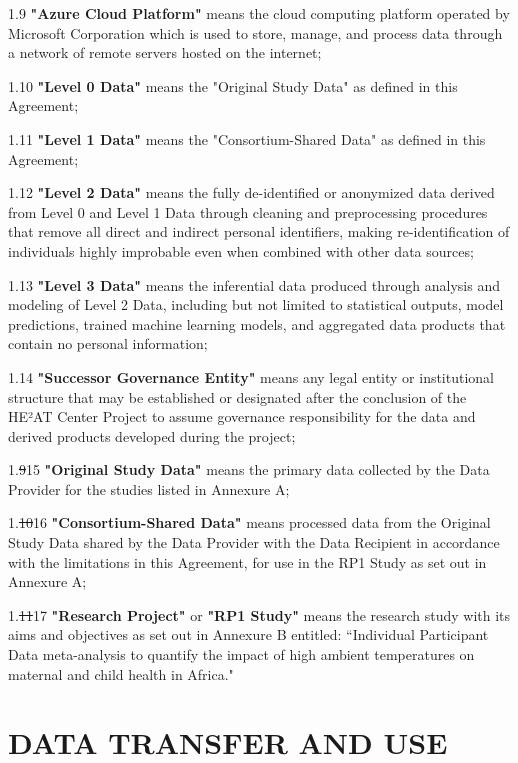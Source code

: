 \documentclass[12pt,letterpaper]{article}
\newcommand{\deleted}[1]{\textcolor{deletecolor}{\sout{#1}}}
\newcommand{\added}[1]{\textcolor{addcolor}{#1}}
\begin{document}
\added{1.9 \textbf{"Azure Cloud Platform"} means the cloud computing platform operated by Microsoft Corporation which is used to store, manage, and process data through a network of remote servers hosted on the internet;}

\added{1.10 \textbf{"Level 0 Data"} means the "Original Study Data" as defined in this Agreement;}

\added{1.11 \textbf{"Level 1 Data"} means the "Consortium-Shared Data" as defined in this Agreement;}

\added{1.12 \textbf{"Level 2 Data"} means the fully de-identified or anonymized data derived from Level 0 and Level 1 Data through cleaning and preprocessing procedures that remove all direct and indirect personal identifiers, making re-identification of individuals highly improbable even when combined with other data sources;}

\added{1.13 \textbf{"Level 3 Data"} means the inferential data produced through analysis and modeling of Level 2 Data, including but not limited to statistical outputs, model predictions, trained machine learning models, and aggregated data products that contain no personal information;}

\added{1.14 \textbf{"Successor Governance Entity"} means any legal entity or institutional structure that may be established or designated after the conclusion of the HE²AT Center Project to assume governance responsibility for the data and derived products developed during the project;}

1.\deleted{9}\added{15} \textbf{"Original Study Data"} means the primary data collected by the Data Provider for the studies listed in Annexure A;

1.\deleted{10}\added{16} \textbf{"Consortium-Shared Data"} means processed data from the Original Study Data shared by the Data Provider with the Data Recipient in accordance with the limitations in this Agreement, for use in the RP1 Study as set out in Annexure A;

1.\deleted{11}\added{17} \textbf{"Research Project"} or \textbf{"RP1 Study"} means the research study with its aims and objectives as set out in Annexure B entitled: ``Individual Participant Data meta-analysis to quantify the impact of high ambient temperatures on maternal and child health in Africa."

\section{DATA TRANSFER AND USE}
\end{document}
